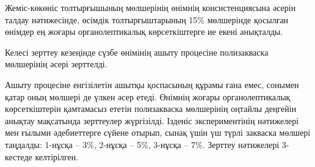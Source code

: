 
\begin{multicols}{2}
Жеміс-көкөніс толтырғышының мөлшерінің өнімнің консистенциясына әсерін
талдау нәтижесінде, өсімдік толтырғыштарының 15\% мөлшерінде қосылған
өнімдер ең жоғары органолептикалық көрсеткіштерге ие екені анықталды.

Келесі зерттеу кезеңінде сүзбе өнімінің ашыту процесіне полизакваска
мөлшерінің әсері зерттелді.

Ашыту процесіне енгізілетін ашытқы қоспасының құрамы ғана емес, сонымен
қатар оның мөлшері де үлкен әсер етеді. Өнімнің жоғары органолептикалық
көрсеткіштерін қамтамасыз ететін полизакваска мөлшерінің оңтайлы
деңгейін анықтау мақсатында зерттеулер жүргізілді. Ізденіс
экспериментінің нәтижелері мен ғылыми әдебиеттерге сүйене отырып, сынақ
үшін үш түрлі закваска мөлшері таңдалды: 1-нұсқа -- 3\%, 2-нұсқа -- 5\%,
3-нұсқа -- 7\%. Зерттеу нәтижелері 3-кестеде келтірілген.
\end{multicols}

